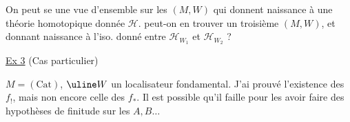 On peut se 
une vue d'ensemble sur les $(M,W)$ qui donnent naissance à une théorie
homotopique donnée $\mathcal H$.
peut-on en trouver un troisième $(M,W)$, et
donnant naissance à l'iso.  donné entre
$\mathcal H_{W_1}$ et $\mathcal H_{W_2}$ ?

\uline{Ex 3} (Cas particulier)

$M=(\mathrm{Cat})$, $\uline W$ un localisateur fondamental.
J'ai prouvé l'existence des $f_!$, mais non encore celle des $f_*$.
Il est possible qu'il faille pour les avoir faire des hypothèses de finitude
sur les $A,B\ldots$
